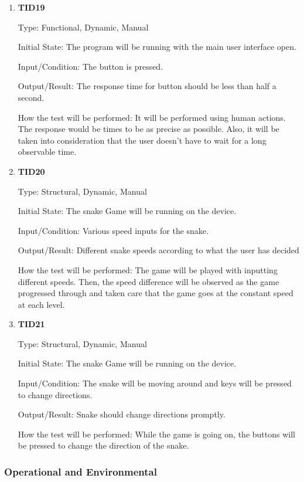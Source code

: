 \documentclass[12pt, titlepage]{article}
\begin{document}
\begin{enumerate}
	
	\item{\textbf{TID19}\\}
	
	Type:  Functional, Dynamic, Manual
	
	Initial State: The program will be running with the main user interface open.
	
	Input/Condition: The button is pressed.
	
	Output/Result: The response time for button should be less than half a second.
	
	How the test will be performed: It will be performed using human actions. The response would be times to be as precise as possible. Also, it will be taken into consideration that the user doesn't have to wait for a long observable time.
	
	\item{\textbf{TID20}\\}
	
	Type: Structural, Dynamic, Manual 
	
	Initial State: The snake Game will be running on the device.
	
	Input/Condition: Various speed inputs for the snake.
	
	Output/Result: Different snake speeds according to what the user has decided
	
	How the test will be performed: The game will be played with inputting different speeds. Then, the speed difference will be observed as the game progressed through and taken care that the game goes at the constant speed at each level.
	
	\item{\textbf{TID21}\\}
	
	Type: Structural, Dynamic, Manual 
	
	Initial State: The snake Game will be running on the device.
	
	Input/Condition: The snake will be moving around and keys will be pressed to change directions.
	
	Output/Result: Snake should change directions promptly.
	
	How the test will be performed: While the game is going on, the buttons will be pressed to change the direction of the snake.
	
	
\end{enumerate}

\subsubsection{Operational and Environmental}
\end{document}

